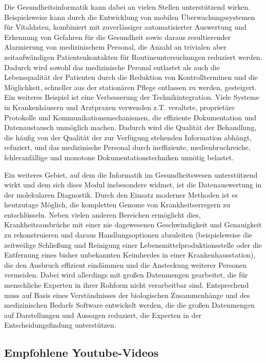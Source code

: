 Die Gesundheitsinformatik kann dabei an vielen Stellen unterstützend wirken. Beispielsweise kann durch die Entwicklung von mobilen Überwachungssystemen für Vitaldaten, kombiniert mit zuverlässiger automatisierter Auswertung und Erkennung von Gefahren für die Gesundheit sowie daraus resultierender Alarmierung von medizinischem Personal, die Anzahl an trivialen aber zeitaufwändigen Patientenkontakten für Routineuntersuchungen reduziert werden. Dadurch wird sowohl das medizinische Peronal entlastet als auch die Lebensqualität der Patienten durch die Reduktion von Kontrollterminen und die Möglichkeit, schneller aus der stationären Pflege entlassen zu werden, gesteigert. Ein weiteres Beispiel ist eine Verbesserung der Technikintegration. Viele Systeme in Krankenhäusern und Arztpraxen verwenden z.T. veraltete, proprietäre Protokolle und Kommunikationsmechanismen, die effiziente Dokumentation und Datenaustausch unmöglich machen. Dadurch wird die Qualität der Behandlung, die häufig von der Qualität der zur Verfügung stehenden Information abhängt, refuziert, und das medizinische Personal durch ineffiziente, medienbruchreiche, fehleranfällige und monotone Dokumentationstechniken unnötig belastet.

Ein weiteres Gebiet, auf dem die Informatik im Gesundheitswesen unterstützend wirkt und dem sich dises Modul insbesondere widmet, ist die Datenauswertung in der molekularen Diagnostik. Durch den Einsatz moderner Methoden ist es heutzutage Möglich, die kompletten Genome von Krankheitserregern zu entschlüsseln. Neben vielen anderen Bereichen ermöglicht dies, Krankheitsausbrüche mit einer nie dagewesenen Geschwindigkeit und Genauigkeit zu rekonstruieren und daraus Handlungsoptionen abzuleiten (beispielsweise die zeitweilige Schließung und Reinigung einer Lebensmittelproduktionsstelle oder die Entfernung eines bisher unbekannten Keimherdes in einer Krankenhausstation), die den Ausbruch effizient eindämmen und die Ansteckung weiterer Personen vermeiden. Dabei wird allerdings mit großen Datenmengen gearbeitet, die für menschliche Experten in ihrer Rohform nicht verarbeitbar sind. Entsprechend muss auf Basis eines Verständnisses der biologischen Zusammenhänge und des medizinischen Bedarfs Software entwickelt werden, die die großen Datenmengen auf Darstellungen und Aussagen reduziert, die Experten in der Entscheidungsfindung unterstützen. 


\subsection{Empfohlene Youtube-Videos}

